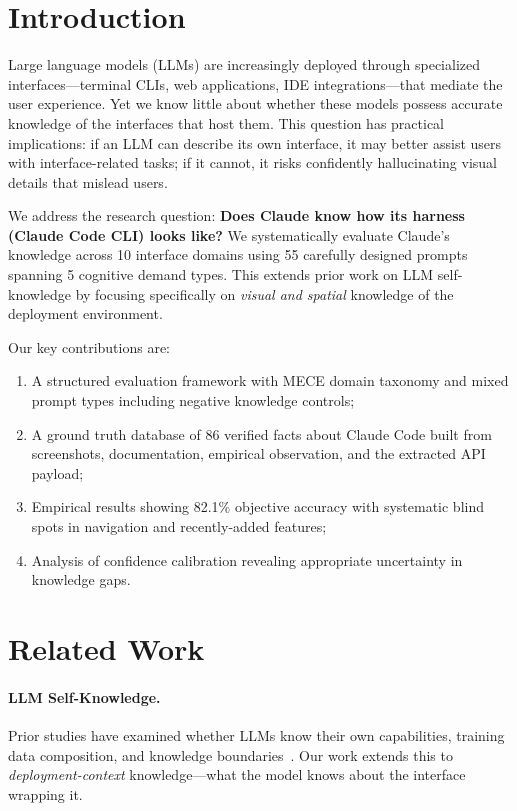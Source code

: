 \documentclass[10pt,twocolumn]{article}
\begin{document}
\section{Introduction}

Large language models (LLMs) are increasingly deployed through specialized interfaces---terminal CLIs, web applications, IDE integrations---that mediate the user experience.
Yet we know little about whether these models possess accurate knowledge of the interfaces that host them.
This question has practical implications: if an LLM can describe its own interface, it may better assist users with interface-related tasks; if it cannot, it risks confidently hallucinating visual details that mislead users.

We address the research question: \textbf{Does Claude know how its harness (Claude Code CLI) looks like?}
We systematically evaluate Claude's knowledge across 10 interface domains using 55 carefully designed prompts spanning 5 cognitive demand types.
This extends prior work on LLM self-knowledge by focusing specifically on \textit{visual and spatial} knowledge of the deployment environment.

Our key contributions are:
\begin{enumerate}
  \item A structured evaluation framework with MECE domain taxonomy and mixed prompt types including negative knowledge controls;
  \item A ground truth database of 86 verified facts about Claude Code built from screenshots, documentation, empirical observation, and the extracted API payload;
  \item Empirical results showing 82.1\% objective accuracy with systematic blind spots in navigation and recently-added features;
  \item Analysis of confidence calibration revealing appropriate uncertainty in knowledge gaps.
\end{enumerate}

\section{Related Work}

\paragraph{LLM Self-Knowledge.}
Prior studies have examined whether LLMs know their own capabilities, training data composition, and knowledge boundaries~\citep{kadavath2022language,yin2023large}.
Our work extends this to \textit{deployment-context} knowledge---what the model knows about the interface wrapping it.
\end{document}
